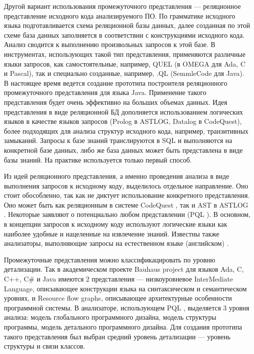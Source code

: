 \documentclass[10pt, a5paper]{article}
\begin{document}
Другой вариант использования промежуточного представления --- реляционное представление исходного кода анализируемого ПО. По грамматике исходного языка подготавливается схема реляционной базы данных, далее созданная по этой схеме база данных заполняется в соответствии с конструкциями исходного кода. Анализ сводится к выполнению произвольных запросов к этой базе. В инструментах, использующих такой тип представления, применяются различные языки запросов, как самостоятельные, например, QUEL \cite{Zubov9} (в OMEGA \cite{Zubov10} для Ada, C и Pascal), так и специально созданные, например, .QL \cite{Zubov11} (SemmleCode \cite{Zubov12} для Java). В настоящее время ведется создание прототипа построителя реляционного промежуточного представления для языка Java. Применение такого представления будет очень эффективно на больших объемах данных. Идея представления в виде реляционной БД дополняется использованием логических языков в качестве языков запросов (Prolog в ASTLOG\cite{Zubov13}, Datalog в CodeQuest\cite{Zubov14}), более подходящих для анализа структур исходного кода, например, транзитивных замыканий. Запросы к базе знаний транслируются в SQL и выполняются на конкретной базе данных, либо же база данных может быть представлена в виде базы знаний. На практике используется только первый способ.

Из идей реляционного представления, а именно проведения анализа в виде выполнения запросов к исходному коду, выделилось отдельное направление. Оно стоит обособленно, так как не диктует использование конкретного представления. Оно может быть как реляционным в системе CodeQuest \cite{Zubov14}, так и AST в ASTLOG \cite{Zubov13}. Некоторые заявляют о потенциально любом представлении (PQL \cite{Zubov15}). В основном, в концепции запросов к исходному коду используют логические языки как наиболее удобные и нацеленные на извлечение знаний. Известны также анализаторы, выполняющие запросы на естественном языке (английском) \cite{Zubov16}.

Промежуточные представления можно классификацировать по уровню детализации. Так в академическом проекте Bauhaus project \cite{Zubov17} для языков Ada, C, C++, C\# и Java имеются 2 представления --- низкоуровневое InterMediate Language, описывающее конструкции языка на синтаксическом и семантическом уровнях, и Resource flow graphs, описывающее архитектурные особенности программной системы. В анализаторе, использующем PQL \cite{Zubov15}, выделяется 3 уровня анализа: модель глобального программного дизайна, модель структуры программы, модель детального программного дизайна. Для создания прототипа такого представления был выбран средний уровень детализации --- уровень структуры и связи классов.
\end{document}
